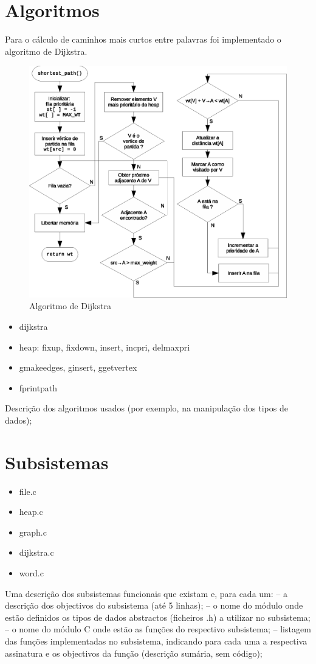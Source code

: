\documentclass[a4paper, 18pt]{article}
\newcommand\tu[0]{\textunderscore}
\begin{document}
\section{Algoritmos}
	Para o cálculo de caminhos mais curtos entre palavras foi implementado o algoritmo de Dijkstra.
	\begin{figure}[H]
		\centering
		\includegraphics[width=\linewidth]{dijkstra}
		\caption{Algoritmo de Dijkstra}
	\end{figure}

	\begin{itemize}
		\item dijkstra
		\item heap: fixup, fixdown, insert, incpri, delmaxpri
		\item g\tu make\tu edges, g\tu insert, g\tu get\tu vertex
		\item fprint\tu path
	\end{itemize}
	\par
	Descrição dos algoritmos usados (por exemplo, na manipulação dos tipos de dados);


\section{Subsistemas}
	\begin{itemize}
		\item file.c
		\item heap.c
		\item graph.c
		\item dijkstra.c
		\item word.c
	\end{itemize}
	\par
	Uma descrição dos subsistemas funcionais que existam e, para cada um:
	– a descrição dos objectivos do subsistema (até 5 linhas);
	– o nome do módulo onde estão definidos os tipos de dados abstractos
	  (ficheiros .h) a utilizar no subsistema;
	– o nome do módulo C onde estão as funções do respectivo subsistema;
	– listagem das funções implementadas no subsistema, indicando para cada uma a
	  respectiva assinatura e os objectivos da função (descrição sumária, sem código);
\end{document}
